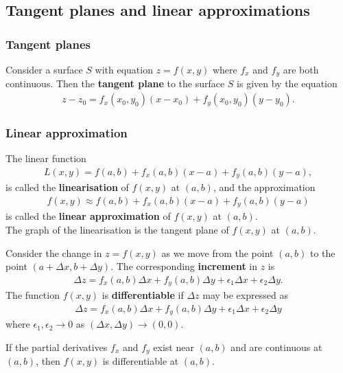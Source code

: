 \documentclass{article}
\begin{document}
\subsection{Tangent planes and linear approximations}


\subsubsection{Tangent planes}

\begin{definition}
    Consider a surface $S$ with equation $z=f(x,y)$ where $f_x$ and $f_y$
    are both continuous. Then the \textbf{tangent plane} to the surface $S$
    is given by the equation
    \begin{align*}
        z - z_0 = f_x(x_0, y_0)(x-x_0) + f_y(x_0,y_0)(y-y_0).
    \end{align*}
\end{definition}

\subsubsection{Linear approximation}

\begin{definition}
    The linear function
    \begin{align*}
        L(x,y)=f(a,b)+f_x(a,b)(x-a)+f_y(a,b)(y-a),
    \end{align*}
    is called the \textbf{linearisation} of $f(x,y)$ at $(a,b)$, and the
    approximation
    \begin{align*}
        f(x,y)\approx f(a,b)+f_x(a,b)(x-a)+f_y(a,b)(y-a)
    \end{align*}
    is called the \textbf{linear approximation} of $f(x,y)$ at $(a,b)$.\\
    The graph of the linearisation is the tangent plane of $f(x,y)$ at
    $(a,b)$.
\end{definition}
\begin{definition}
    Consider the change in $z=f(x,y)$ as we move from the point
    $(a,b)$ to the point $(a+\Delta x, b+\Delta y)$. The
    corresponding \textbf{increment} in $z$ is
    \begin{align*}
        \Delta z = f_x(a,b)\Delta x + f_y(a,b)\Delta y
        + \epsilon_1\Delta x + \epsilon_2\Delta y.
    \end{align*}
    The function $f(x,y)$ is \textbf{differentiable} if $\Delta z$
    may be expressed as
    \begin{align*}
        \Delta z = f_x(a,b)\Delta x + f_y(a,b)\Delta y
        + \epsilon_1\Delta x + \epsilon_2\Delta y
    \end{align*}
    where $\epsilon_1, \epsilon_2 \to 0$ as
    $(\Delta x, \Delta y)\to(0,0)$.
\end{definition}
\begin{theorem}
    If the partial derivatives $f_x$ and $f_y$ exist near
    $(a,b)$ and are continuous at $(a,b)$, then $f(x,y)$
    is differentiable at $(a,b)$.
\end{theorem}
\end{document}

